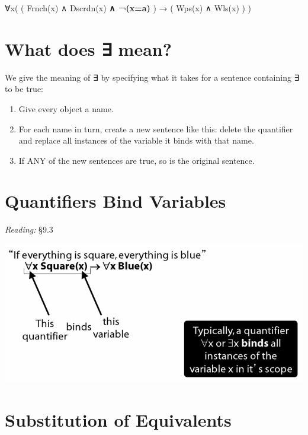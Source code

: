 \documentclass[12pt]{extarticle}
\begin{document}
\begin{multicols*}{3}
\begin{minipage}{\columnwidth}
∀x( ( Frnch(x) ∧ Dscrdn(x) \textbf{∧ ¬(x=a)} ) → ( Wps(x) ∧ Wls(x) ) )
 
\end{minipage}
 
 
 
\columnbreak  
\section{What does ∃ mean?}
 
We give the meaning of ∃ by specifying what it takes for a sentence containing ∃ to be true:
 
\begin{enumerate}
 
\item Give every object a name.
 
\item For each name in turn, create a new sentence like this: delete the quantifier and replace all instances of the variable it binds with that name.
 
\item If ANY of the new sentences are true, so is the original sentence.
 
\end{enumerate}
 
 
 
\section{Quantifiers Bind Variables}
 
\emph{Reading:} §9.3
 
\begin{center}
\includegraphics[scale=0.3]{img/quantifiers_scope.png}
\end{center}
 
\columnbreak 
\section{Substitution of Equivalents}
 

\end{multicols*}
\end{document}
